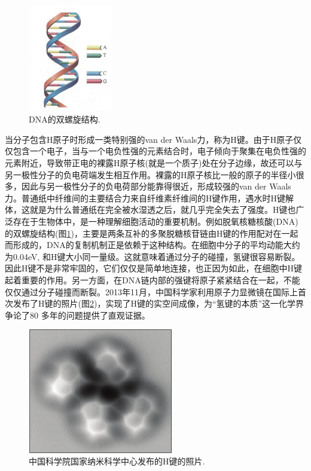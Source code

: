 \begin{figure}[h!]
\centering
\vspace*{-0.1in}
\includegraphics[height=1.85in,width=1.5in,viewport=0 0 70 90,clip]{Figures/Double_helix-structure-DNA.png}
\caption{\small \textrm{DNA的双螺旋结构.}}%
\label{Fig:DNA}
\end{figure}
当分子包含H原子时形成一类特别强的van der Waals力，称为H键。由于H原子仅仅包含一个电子，当与一个电负性强的元素结合时，电子倾向于聚集在电负性强的元素附近，导致带正电的裸露H原子核(就是一个质子)处在分子边缘，故还可以与另一极性分子的负电荷端发生相互作用。裸露的H原子核比一般的原子的半径小很多，因此与另一极性分子的负电荷部分能靠得很近，形成较强的van der Waals力。普通纸中纤维间的主要结合力来自纤维素纤维间的H键作用，遇水时H键解体，这就是为什么普通纸在完全被水湿透之后，就几乎完全失去了强度。H键也广泛存在于生物体中，是一种理解细胞活动的重要机制。例如脱氧核糖核酸(DNA)的双螺旋结构(图\ref{Fig:DNA})，主要是两条互补的多聚脱糖核苷链由H键的作用配对在一起而形成的，DNA的复制机制正是依赖于这种结构。在细胞中分子的平均动能大约为0.04eV, 和H键大小同一量级。这就意味着通过分子的碰撞，氢键很容易断裂。因此H键不是非常牢固的，它们仅仅是简单地连接，也正因为如此，在细胞中H键起着重要的作用。另一方面，在DNA链内部的强键将原子紧紧结合在一起，不能仅仅通过分子碰撞而断裂。2013年11月，中国科学家利用原子力显微镜在国际上首次发布了H键的照片(图\ref{Fig:H-bond})，实现了H键的实空间成像，为``氢键的本质''这一化学界争论了80 多年的问题提供了直观证据。
\begin{figure}[h!]
\centering
\vspace*{-0.1in}
\includegraphics[height=2.15in,width=2.5in,viewport=0 0 840 730,clip]{Figures/Image-of-H_bond.png}
\caption{\small \textrm{中国科学院国家纳米科学中心发布的H键的照片.}}%
\label{Fig:H-bond}
\end{figure}


